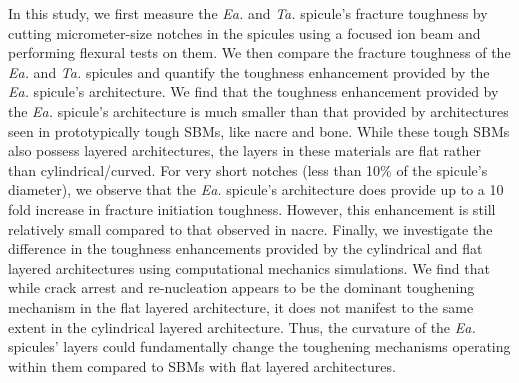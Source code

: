 \documentclass[12pt,onecolumn]{article}
\makeatletter
\DeclareRobustCommand*{\nameref}[1]{%
      \emph{\myorg@nameref{#1}}%
    }%
\newcommand{\TA}{\textit{Ta.\@}\xspace}
\newcommand{\EA}{\textit{Ea.\@}\xspace}
\makeatother
\begin{document}
In this study, we first measure the \EA and \TA spicule's fracture toughness by cutting micrometer-size notches in the spicules using a focused ion beam and performing flexural tests on them. 
%
%
We then compare the fracture toughness of the \EA and \TA spicules and quantify the toughness enhancement provided by the \EA spicule's architecture. We find that the toughness enhancement provided by the \EA spicule's architecture is much smaller than that provided by architectures seen in prototypically tough SBMs, like nacre and bone. While these tough SBMs also possess layered architectures, the layers in these materials are flat rather than cylindrical/curved. 
%
For very short notches (less than 10\% of the spicule's diameter), we observe that the \EA spicule's architecture does provide up to a 10 fold increase in fracture initiation toughness. However, this enhancement is still relatively small compared to that observed in nacre. 
%
Finally, we investigate the difference in the toughness enhancements provided by the cylindrical and flat layered architectures using computational mechanics simulations. 
%
%
We find that while crack arrest and re-nucleation appears to be the dominant toughening mechanism in the flat layered architecture, it does not manifest to the same extent in the cylindrical layered architecture. Thus, the curvature of the \EA spicules' layers could fundamentally change the toughening mechanisms operating within them compared to SBMs with flat layered architectures.



\end{document}
